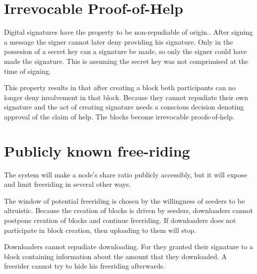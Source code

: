 \section{Irrevocable Proof-of-Help}
Digital signatures have the property to be non-repudiable of origin.\cite{VanderLubbe-crypto}.
After signing a message the signer cannot later deny providing his signature.
Only in the possesion of a secret key can a signature be made,
so only the signer could have made the signature.
This is assuming the secret key was not comprimised at the time of signing.

This property results in that after creating a block
both participants can no longer deny involvement in that block.
Because they cannot repudiate their own signature
and the act of creating signature needs a conscious decision denoting approval of the claim of help.
The blocks become irrevocable proofs-of-help.

\section{Publicly known free-riding}
The system will make a node's share ratio publicly accessibly,
but it will expose and limit freeriding in several other ways.

The window of potential freeriding is chosen by the willingness of seeders to be altruistic.
Because the creation of blocks is driven by seeders,
downloaders cannot postpone creation of blocks and continue freeriding.
If downloaders does not participate in block creation,
then uploading to them will stop.

Downloaders cannot repudiate downloading.
For they granted their signature to a block containing information about the amount that they downloaded.
A freerider cannot try to hide his freeriding afterwards.


